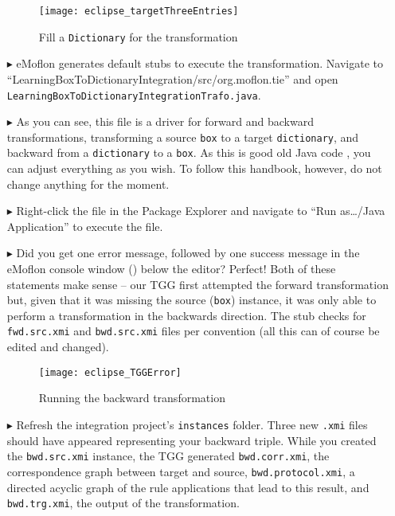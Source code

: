 \begin{itemize}
\begin{figure}[htbp]
\begin{center}
  \texttt{[image: eclipse\_targetThreeEntries]}
  \caption{Fill a \texttt{Dictionary} for the transformation}
  \label{eclipse:dictionaryxmi}
\end{center}
\end{figure}

\item[$\blacktriangleright$] eMoflon generates default stubs to execute the transformation.
Navigate to ``LearningBox\-To\-Dictionary\-In\-te\-gra\-tion\-/\-src/\-org.\-mof\-lon.\-tie'' and open \texttt{Learn\-ing\-Box\-To\-Dict\-ion\-ary\-Int\-e\-grat\-ion\-Trafo.\-java}.

\item[$\blacktriangleright$] As you can see, this file is a driver for forward and backward transformations, transforming a source \texttt{box} to a target \texttt{dictionary}, and backward from a \texttt{dictionary} to a \texttt{box}. 
As this is good old Java code , you can adjust everything as you wish.
To follow this handbook, however, do not change anything for the moment.

\item[$\blacktriangleright$] Right-click the file in the Package Explorer and navigate to ``Run as\ldots/Java Application'' to execute the file.

\item[$\blacktriangleright$] Did you get one error message, followed by one success message in the eMoflon console window () below
the editor? Perfect! Both of these statements make sense -- our TGG first attempted the forward transformation but, given that it was missing the source
(\texttt{box}) instance, it was only able to perform a transformation in the backwards direction.
The stub checks for \texttt{fwd.src.xmi} and \texttt{bwd.src.xmi} files per convention (all this can of course be edited and changed).

\begin{figure}[htbp]
\begin{center}
  \texttt{[image: eclipse\_TGGError]}
  \caption{Running the backward transformation}
  \label{eclipse:tggERROR}
\end{center}
\end{figure}

\item[$\blacktriangleright$] Refresh the integration project's \texttt{instances} folder. 
Three new \texttt{.xmi} files should have appeared representing your backward triple. 
While you created the \texttt{bwd.src.xmi} instance, the TGG generated \texttt{bwd.corr.xmi}, the correspondence graph between target and source, \texttt{bwd.protocol.xmi}, a directed acyclic graph of the rule applications that lead to this result, and \texttt{bwd.trg.xmi}, the output of the transformation. 


\end{itemize}
